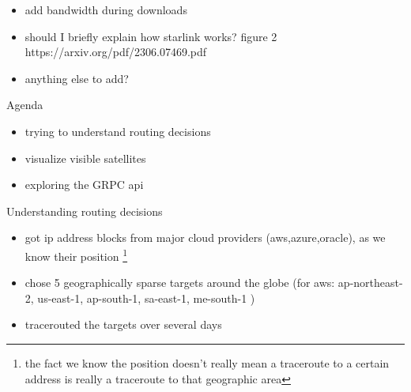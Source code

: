\documentclass[NET,english,beameralt]{tumbeamer}
\begin{document}
\begin{frame}
    \begin{itemize}
        \item add bandwidth during downloads
        \item should I briefly explain how starlink works? figure 2 https://arxiv.org/pdf/2306.07469.pdf
        \item anything else to add?
    \end{itemize}
\end{frame}

\begin{frame}{Agenda}
    \begin{itemize}
        \item trying to understand routing decisions
        \item visualize visible satellites
        \item exploring the GRPC api
    \end{itemize}
\end{frame}
\begin{frame}{Understanding routing decisions}
    \begin{itemize}
        \item got ip address blocks from major cloud providers (aws,azure,oracle), as we know their position \footnote[]{the fact we know the position doesn't really mean a traceroute to a certain address is really a traceroute to that geographic area}
        \item chose 5 geographically sparse targets around the globe (for aws: ap-northeast-2, us-east-1, ap-south-1, sa-east-1, me-south-1 )
        \item tracerouted the targets over several days 
    \end{itemize}
\end{frame}
\end{document}
